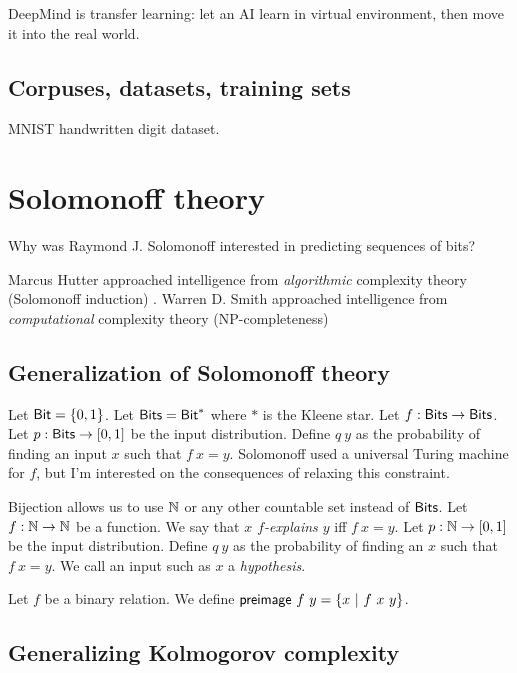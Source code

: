 DeepMind is transfer learning:
let an AI learn in virtual environment,
then move it into the real world.

\section{Corpuses, datasets, training sets}

MNIST handwritten digit dataset.


\chapter{Solomonoff theory}

Why was Raymond J. Solomonoff \cite{SolAlpProb2011, GacsVitanyiSolomonoff}
interested in predicting sequences of bits?

Marcus Hutter approached intelligence from \emph{algorithmic} complexity theory (Solomonoff induction)
\cite{DefineMachIntel}.
Warren D. Smith approached intelligence from \emph{computational} complexity theory
(NP-completeness)
\cite{WdsIntel, WdsIntelSlide}

\section{Generalization of Solomonoff theory}

\newcommand\Bit{\fun{Bit}}
\newcommand\Bits{\fun{Bits}}

Let \(\Bit = \{0,1\}\).
Let \(\Bits = \Bit^*\) where \(*\) is the Kleene star.
Let \(f : \Bits \to \Bits\).
Let \(p : \Bits \to [0,1]\) be the input distribution.
Define \(q~y\) as the probability of finding an input \(x\) such that \(f~x = y\).
Solomonoff used a universal Turing machine for \(f\),
but I'm interested on the consequences of relaxing this constraint.

Bijection allows us to use \(\mathbb{N}\) or any other countable set instead of \(\Bits\).
Let \(f : \mathbb{N} \to \mathbb{N}\) be a function.
We say that \emph{\(x\) \(f\)-explains \(y\)} iff \(f~x = y\).
Let \(p : \mathbb{N} \to [0,1]\) be the input distribution.
Define \(q~y\) as the probability of finding an \(x\) such that \(f~x = y\).
We call an input such as \(x\) a \emph{hypothesis}.

\newcommand\preimage{\fun{preimage}}

Let \(f\) be a binary relation.
We define \(\preimage~f~y = \{ x ~|~ f~x~y \}\).

\section{Generalizing Kolmogorov complexity}

